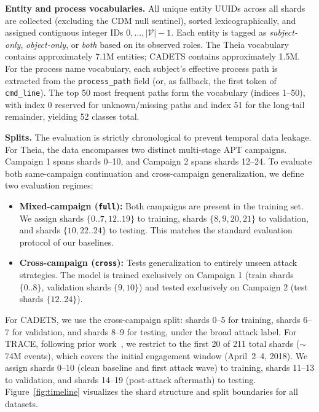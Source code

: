 \documentclass[letterpaper,twocolumn,10pt]{article}
\begin{document}
\textbf{Entity and process vocabularies.}
\label{sec:setup}
All unique entity UUIDs across all shards are collected (excluding the CDM null sentinel), sorted lexicographically, and assigned contiguous integer IDs $0, \ldots, |\mathcal{V}|-1$. Each entity is tagged as \emph{subject-only}, \emph{object-only}, or \emph{both} based on its observed roles. The Theia vocabulary contains approximately 7.1M entities; CADETS contains approximately 1.5M. For the process name vocabulary, each subject's effective process path is extracted from the \texttt{process\_path} field (or, as fallback, the first token of \texttt{cmd\_line}). The top 50 most frequent paths form the vocabulary (indices 1--50), with index 0 reserved for unknown/missing paths and index 51 for the long-tail remainder, yielding 52 classes total.

\textbf{Splits.} The evaluation is strictly chronological to prevent temporal data leakage. For Theia, the data encompasses two distinct multi-stage APT campaigns. Campaign 1 spans shards 0--10, and Campaign 2 spans shards 12--24. To evaluate both same-campaign continuation and cross-campaign generalization, we define two evaluation regimes:
\begin{itemize}
    \item \textbf{Mixed-campaign (\texttt{full}):} Both campaigns are present in the training set. We assign shards $\{0..7, 12..19\}$ to training, shards $\{8, 9, 20, 21\}$ to validation, and shards $\{10, 22..24\}$ to testing. This matches the standard evaluation protocol of our baselines.
    \item \textbf{Cross-campaign (\texttt{cross}):} Tests generalization to entirely unseen attack strategies. The model is trained exclusively on Campaign 1 (train shards $\{0..8\}$, validation shards $\{9, 10\}$) and tested exclusively on Campaign 2 (test shards $\{12..24\}$).
\end{itemize}
For CADETS, we use the cross-campaign split: shards 0--5 for training, shards 6--7 for validation, and shards 8--9 for testing, under the broad attack label. For TRACE, following prior work~\cite{cheng2024kairos,jia2024magic}, we restrict to the first 20 of 211 total shards ($\sim$74M events), which covers the initial engagement window (April~2--4, 2018). We assign shards 0--10 (clean baseline and first attack wave) to training, shards 11--13 to validation, and shards 14--19 (post-attack aftermath) to testing. Figure~\ref{fig:timeline} visualizes the shard structure and split boundaries for all datasets.
\end{document}
